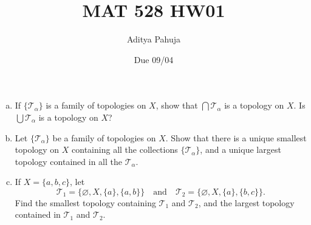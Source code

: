 \documentclass[11pt]{scrartcl}
\title{\vspace{-2em}MAT 528 HW01}
\author{\large Aditya Pahuja}
\date{\large Due 09/04}
\providecommand{\ii}{\item}
\begin{document}
\maketitle

\begin{problem*}
    [Munkres 13.4]
    \begin{enumerate}[(a)]
        \ii If $\{\mathcal T_\alpha\}$ is a family of topologies on $X$,
	show that $\bigcap \mathcal T_\alpha$ is a topology on $X$.
	Is $\bigcup\mathcal T_\alpha$ is a topology on $X$?
	\ii Let $\{\mathcal T_\alpha\}$ be a family of topologies on $X$.
	Show that there is a unique smallest topology on $X$ containing
	all the collections $\{\mathcal T_\alpha\}$,
	and a unique largest topology contained in all the $\mathcal T_\alpha$.
	\ii If $X = \{a,b,c\}$, let
	\begin{equation*}
	    \mathcal T_1 = \{\varnothing, X, \{a\}, \{a,b\}\}\quad\text{and}\quad
	    \mathcal T_2 = \{\varnothing, X, \{a\}, \{b,c\}\}.
	\end{equation*}
	Find the smallest topology containing $\mathcal T_1$ and $\mathcal T_2$,
	and the largest topology contained in $\mathcal T_1$ and $\mathcal T_2$.
    \end{enumerate}
\end{problem*}
\end{document}
